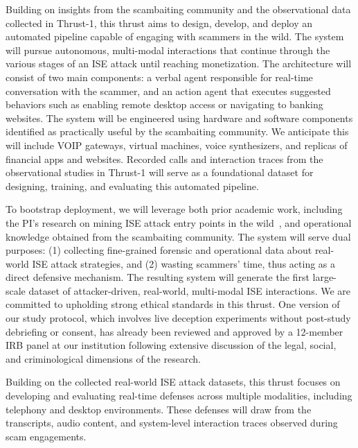 Building on insights from the scambaiting community and the observational data collected in Thrust-1, this thrust aims to design, develop, and deploy an automated pipeline capable of engaging with scammers in the wild. The system will pursue autonomous, multi-modal interactions that continue through the various stages of an ISE attack until reaching monetization. The architecture will consist of two main components: a verbal agent responsible for real-time conversation with the scammer, and an action agent that executes suggested behaviors such as enabling remote desktop access or navigating to banking websites. The system will be engineered using hardware and software components identified as practically useful by the scambaiting community. We anticipate this will include VOIP gateways, virtual machines, voice synthesizers, and replicas of financial apps and websites. Recorded calls and interaction traces from the observational studies in Thrust-1 will serve as a foundational dataset for designing, training, and evaluating this automated pipeline.

To bootstrap deployment, we will leverage both prior academic work, including the PI's research on mining ISE attack entry points in the wild~\cite{seacma,tasr,MiramirkhaniSN16,SrinivasanKMANA18,honeytweets}, and operational knowledge obtained from the scambaiting community. The system will serve dual purposes: (1) collecting fine-grained forensic and operational data about real-world ISE attack strategies, and (2) wasting scammers' time, thus acting as a direct defensive mechanism. The resulting system will generate the first large-scale dataset of attacker-driven, real-world, multi-modal ISE interactions. We are committed to upholding strong ethical standards in this thrust. One version of our study protocol, which involves live deception experiments without post-study debriefing or consent, has already been reviewed and approved by a 12-member IRB panel at our institution following extensive discussion of the legal, social, and criminological dimensions of the research.

 

Building on the collected real-world ISE attack datasets, this thrust focuses on developing and evaluating real-time defenses across multiple modalities, including telephony and desktop environments. These defenses will draw from the transcripts, audio content, and system-level interaction traces observed during scam engagements.

